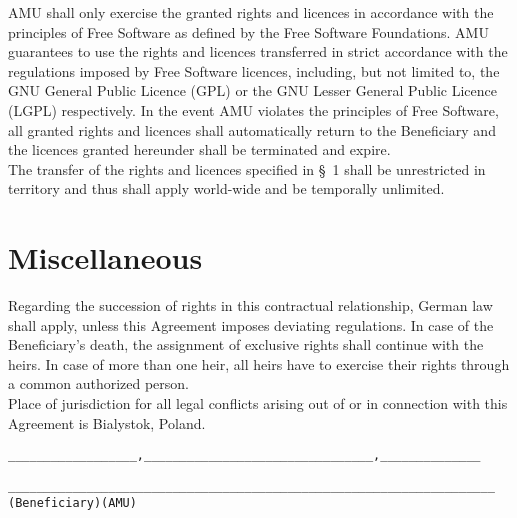 \A AMU shall only exercise the granted rights and licences in
accordance with the principles of Free Software as defined by 
the Free Software Foundations. AMU guarantees to use the rights 
and licences transferred in strict accordance with the
regulations imposed by Free Software licences, including, but not
limited to, the GNU General Public Licence (GPL) or the GNU Lesser
General Public Licence (LGPL) respectively. In the event AMU violates
the principles of Free Software, all granted rights and licences shall
automatically return to the Beneficiary and the licences granted
hereunder shall be terminated and expire.\\

\A The transfer of the rights and licences specified in {\S}~1 shall
be unrestricted in territory and thus shall apply world-wide and be
temporally unlimited.

\section{Miscellaneous}
\A Regarding the succession of rights in this contractual
relationship, German law shall apply, unless this Agreement imposes
deviating regulations. In case of the Beneficiary's death, the
assignment of exclusive rights shall continue with the heirs. In case
of more than one heir, all heirs have to exercise their rights through
a common authorized person.\\

\A Place of jurisdiction for all legal conflicts arising out of or in
connection with this Agreement is Bialystok, Poland.\\

\enlargethispage{2cm}
\vspace{3cm}
\begin{alltt}
__________________, ______________    __________________, ______________




__________________________________    __________________________________
           (Beneficiary)                         (AMU)
\end{alltt}


